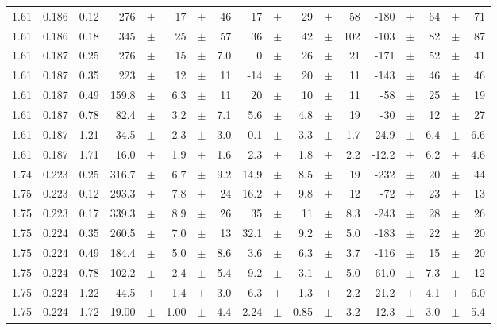 \documentclass[prc,floatfix,twocolumn,superscriptaddress,letter]{revtex4}
\begin{document}
\begin{longtable}{ccc@{\extracolsep{1cm}}d@{\extracolsep{0pt}}cdcd@{\extracolsep{1cm}}d@{\extracolsep{0pt}}cdcd@{\extracolsep{1cm}}d@{\extracolsep{0pt}}cdcd}
1.61 & 0.186 & 0.12 	&	 276	 &  $\pm$	& 17 &	 $\pm$	& 46 &	 17 &	$\pm$& 	 29 &	$\pm$& 	 58 & -180 & $\pm$ & 64 & 	$\pm$ & 71\\
1.61 & 0.186 & 0.18 	&	 345	 &  $\pm$	& 25 &	 $\pm$	& 57 &	 36 &	$\pm$& 	 42 &	$\pm$& 	 102 & -103 & $\pm$ & 82 & 	$\pm$ & 87\\
1.61 & 0.187 & 0.25 	&	 276	 &  $\pm$	& 15 &	 $\pm$	& 7.0 &	 0 &	$\pm$& 	 26 &	$\pm$& 	 21 & -171 & $\pm$ & 52 & 	$\pm$ & 41\\
1.61 & 0.187 & 0.35 	&	 223	 &  $\pm$	& 12 &	 $\pm$	& 11 &	 -14 &	$\pm$& 	 20 &	$\pm$& 	 11 & -143 & $\pm$ & 46 & 	$\pm$ & 46\\
1.61 & 0.187 & 0.49 	&	 159.8	 &  $\pm$	& 6.3 &	 $\pm$	& 11 &	 20 &	$\pm$& 	 10 &	$\pm$& 	 11 & -58 & $\pm$ & 25 & 	$\pm$ & 19\\
1.61 & 0.187 & 0.78 	&	 82.4	 &  $\pm$	& 3.2 &	 $\pm$	& 7.1 &	 5.6 &	$\pm$& 	 4.8 &	$\pm$& 	 19 & -30 & $\pm$ & 12 & 	$\pm$ & 27\\
1.61 & 0.187 & 1.21 	&	 34.5	 &  $\pm$	& 2.3 &	 $\pm$	& 3.0 &	 0.1 &	$\pm$& 	 3.3 &	$\pm$& 	 1.7 & -24.9 & $\pm$ & 6.4 & 	$\pm$ & 6.6\\
1.61 & 0.187 & 1.71 	&	 16.0	 &  $\pm$	& 1.9 &	 $\pm$	& 1.6 &	 2.3 &	$\pm$& 	 1.8 &	$\pm$& 	 2.2 & -12.2 & $\pm$ & 6.2 & 	$\pm$ & 4.6\\
1.74 & 0.223 & 0.25 	&	 316.7	 &  $\pm$	& 6.7 &	 $\pm$	& 9.2 &	 14.9 &	$\pm$& 	 8.5 &	$\pm$& 	 19 & -232 & $\pm$ & 20 & 	$\pm$ & 44\\
1.75 & 0.223 & 0.12 	&	 293.3	 &  $\pm$	& 7.8 &	 $\pm$	& 24 &	 16.2 &	$\pm$& 	 9.8 &	$\pm$& 	 12 & -72 & $\pm$ & 23 & 	$\pm$ & 13\\
1.75 & 0.223 & 0.17 	&	 339.3	 &  $\pm$	& 8.9 &	 $\pm$	& 26 &	 35 &	$\pm$& 	 11 &	$\pm$& 	 8.3 & -243 & $\pm$ & 28 & 	$\pm$ & 26\\
1.75 & 0.224 & 0.35 	&	 260.5	 &  $\pm$	& 7.0 &	 $\pm$	& 13 &	 32.1 &	$\pm$& 	 9.2 &	$\pm$& 	 5.0 & -183 & $\pm$ & 22 & 	$\pm$ & 20\\
1.75 & 0.224 & 0.49 	&	 184.4	 &  $\pm$	& 5.0 &	 $\pm$	& 8.6 &	 3.6 &	$\pm$& 	 6.3 &	$\pm$& 	 3.7 & -116 & $\pm$ & 15 & 	$\pm$ & 20\\
1.75 & 0.224 & 0.78 	&	 102.2	 &  $\pm$	& 2.4 &	 $\pm$	& 5.4 &	 9.2 &	$\pm$& 	 3.1 &	$\pm$& 	 5.0 & -61.0 & $\pm$ & 7.3 & 	$\pm$ & 12\\
1.75 & 0.224 & 1.22 	&	 44.5	 &  $\pm$	& 1.4 &	 $\pm$	& 3.0 &	 6.3 &	$\pm$& 	 1.3 &	$\pm$& 	 2.2 & -21.2 & $\pm$ & 4.1 & 	$\pm$ & 6.0\\
1.75 & 0.224 & 1.72 	&	 19.00	 &  $\pm$	& 1.00 &	 $\pm$	& 4.4 &	 2.24 &	$\pm$& 	 0.85 &	$\pm$& 	 3.2 & -12.3 & $\pm$ & 3.0 & 	$\pm$ & 5.4\\

\end{longtable}
\end{document}
